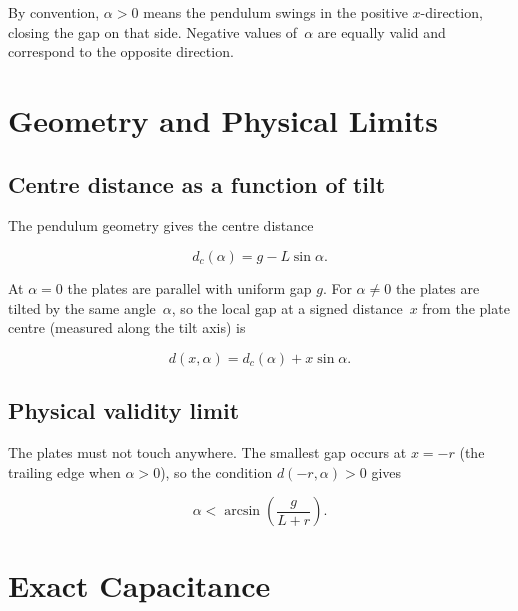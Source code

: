 \documentclass[11pt,a4paper]{article}
\begin{document}
By convention, $\alpha > 0$ means the pendulum swings in the positive
$x$-direction, closing the gap on that side.  Negative values of~$\alpha$
are equally valid and correspond to the opposite direction.

\section{Geometry and Physical Limits}

\subsection{Centre distance as a function of tilt}

The pendulum geometry gives the centre distance

\begin{equation}
  d_c(\alpha) = g - L\sin\alpha .
  \label{eq:dc}
\end{equation}

At $\alpha = 0$ the plates are parallel with uniform gap $g$.  For
$\alpha \neq 0$ the plates are tilted by the same angle~$\alpha$, so the
local gap at a signed distance~$x$ from the plate centre (measured along
the tilt axis) is

\begin{equation}
  d(x,\alpha) = d_c(\alpha) + x\sin\alpha .
  \label{eq:localGap}
\end{equation}

\subsection{Physical validity limit}

The plates must not touch anywhere.  The smallest gap occurs at
$x = -r$ (the trailing edge when $\alpha > 0$), so the condition
$d(-r,\alpha) > 0$ gives

\begin{equation}
  \boxed{\alpha < \arcsin\!\left(\frac{g}{L + r}\right).}
  \label{eq:alphaMax}
\end{equation}



\section{Exact Capacitance}
\end{document}
